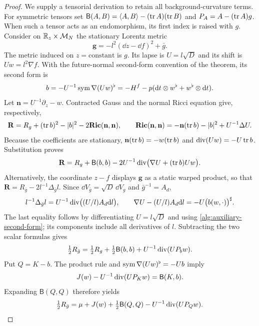 \begin{proof}
We supply a tensorial derivation to retain all background-curvature terms.
For symmetric tensors set
$\mathsf B(A,B)=\langle A,B\rangle-(\operatorname{tr} A)(\operatorname{tr} B)$ and
$P_A=A-(\operatorname{tr} A)g$.  When such a tensor acts as an endomorphism, its first
index is raised with $g$.  Consider on $\mathbb R_z\times\mathcal M_N$ the stationary
Lorentz metric
\[
 \mathbf g=-l^2(\dd z-\dd f)^2+\bar g.
\]
The metric induced on $z=\mathrm{constant}$ is $g$.  Its lapse is
$U=l\sqrt D$ and its shift is $Uw=l^2\nabla f$.  With the future-normal
second-form convention of the theorem, its second form is
\begin{equation}
 b=-U^{-1}\operatorname{sym}\nabla(Uw)^\flat
   =-H^f-p(\mathrm d t\otimes w^\flat+w^\flat\otimes\mathrm d t).
 \label{alg:auxiliary-second-form}
\end{equation}
Let $\mathbf n=U^{-1}\partial_z-w$.  Contracted Gauss and the normal
Ricci equation give, respectively,
\[
 \mathbf R=R_g+(\operatorname{tr} b)^2-|b|^2-2\mathbf{Ric}(\mathbf n,\mathbf n),
 \qquad
 \mathbf{Ric}(\mathbf n,\mathbf n)
 =-\mathbf n(\operatorname{tr} b)-|b|^2+U^{-1}\Delta U.
\]
Because the coefficients are stationary,
$\mathbf n(\operatorname{tr} b)=-w(\operatorname{tr} b)$ and $\operatorname{div}(Uw)=-U\operatorname{tr} b$.
Substitution proves
\begin{equation}
 \mathbf R=R_g+\mathsf B(b,b)
 -2U^{-1}\operatorname{div}\bigl(\nabla U+(\operatorname{tr} b)Uw\bigr).
 \label{alg:stationary-scalar}
\end{equation}
Alternatively, the coordinate $z-f$ displays $\mathbf g$ as a static
warped product, so that
$\mathbf R=R_{\bar g}-2l^{-1}\Delta_{\bar g}l$.
Since $\dd V_{\bar g}=\sqrt D\,\dd V_g$ and $\bar g^{-1}=A_d$,
\[
 l^{-1}\Delta_{\bar g}l
  =U^{-1}\operatorname{div}\bigl((U/l)A_d\mathrm d l\bigr),\qquad
 \nabla U-(U/l)A_d\mathrm d l=-U\bigl(b(w,\cdot)\bigr)^\sharp.
\]
The last equality follows by differentiating $U=l\sqrt D$ and using
\eqref{alg:auxiliary-second-form}; its components include all derivatives
of $l$.  Subtracting the two scalar formulas gives
\[
 \tfrac12R_{\bar g}=\tfrac12R_g+\tfrac12\mathsf B(b,b)
                      +U^{-1}\operatorname{div}(UP_bw).
\]
Put $Q=K-b$.  The product rule and
$\operatorname{sym}\nabla(Uw)^\flat=-Ub$ imply
\[
 J(w)-U^{-1}\operatorname{div}(UP_Kw)=\mathsf B(K,b).
\]
Expanding $\mathsf B(Q,Q)$ therefore yields
\begin{equation}
 \tfrac12R_{\bar g}
 =\mu+J(w)+\tfrac12\mathsf B(Q,Q)-U^{-1}\operatorname{div}(UP_Qw).
 \label{alg:graph-scalar}
\end{equation}


\end{proof}
